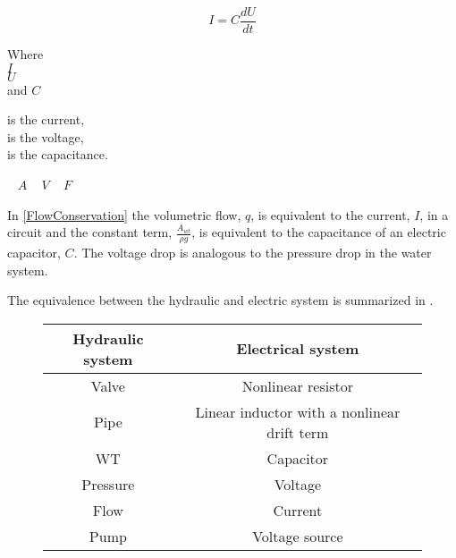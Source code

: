 \begin{equation}
  I = C \frac{dU}{dt}
  \label{ElecCircuirt}
\end{equation}

\begin{minipage}[t]{0.20\textwidth}
Where\\
\hspace*{8mm} $I$ \\
\hspace*{8mm} $U$ \\
and \hspace*{0.7mm} $C$ 
\end{minipage}
\begin{minipage}[t]{0.68\textwidth}
\vspace*{2mm}
is the current,\\
is the voltage,\\
is the capacitance.
\end{minipage}
\begin{minipage}[t]{0.10\textwidth}
\vspace*{2mm}
\textcolor{White}{te}$\unit{A}$
\textcolor{White}{te}$\unit{V}$
\textcolor{White}{te}$\unit{F}$
\end{minipage}

In \eqref{FlowConservation} the volumetric flow, $q$, is equivalent to the current, $I$, in a circuit and the constant term, $\frac{A_{wt}}{\rho g}$, is equivalent to the capacitance of an electric capacitor, $C$. The voltage drop is analogous to the pressure drop in the water system.


%
%
The equivalence between the hydraulic and electric system is summarized in .

\begin{figure}[H]
	\centering
\begin{tabular}{c|c} 
  			\bfseries Hydraulic system    &     \bfseries Electrical system  \\ \hline
			Valve		  	  &     Nonlinear resistor   \\ 
			Pipe              &     Linear inductor with a nonlinear drift term       \\ 
			WT 		          &     Capacitor       \\
			Pressure	 	  &     Voltage    \\
			Flow 		      &     Current       \\  
			Pump 		      &     Voltage source           
\end{tabular}
		\label{tab:hydraulic_electrical}

\end{figure}	


	